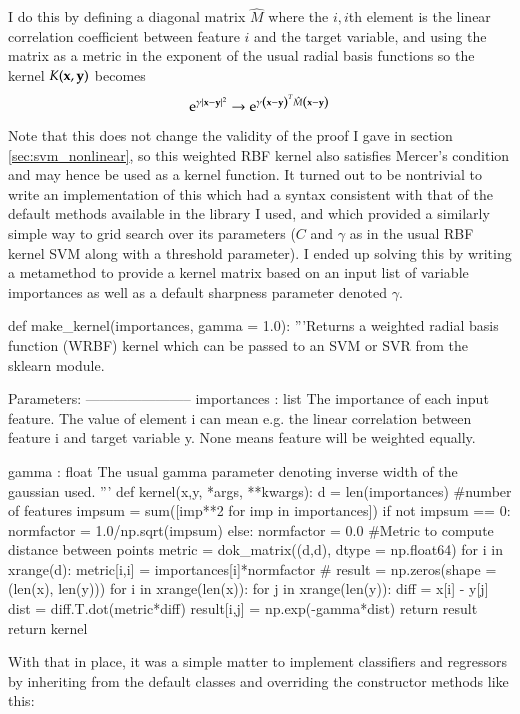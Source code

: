 I do this by defining a diagonal matrix $\hat{M}$ where the $i, i$th element is the linear correlation coefficient between feature $i$ and the target variable, and using the matrix as a metric in the exponent of the usual radial basis functions so the kernel $K(\mathbf{x}, \mathbf{y})$ becomes
\begin{equation}
	\mathrm{e}^{\gamma|\mathbf{x}-\mathbf{y}|^2} \rightarrow \mathrm{e}^{\gamma \left( \mathbf{x}-\mathbf{y} \right)^T \hat{M} \left( \mathbf{x}-\mathbf{y} \right)}
\end{equation}
Note that this does not change the validity of the proof I gave in section \ref{sec:svm_nonlinear}, so this weighted RBF kernel also satisfies Mercer's condition and may hence be used as a kernel function. It turned out to be nontrivial to write an implementation of this which had a syntax consistent with that of the default methods available in the library I used, and which provided a similarly simple way to grid search over its parameters ($C$ and $\gamma$ as in the usual RBF kernel SVM along with a threshold parameter). I ended up solving this by writing a metamethod to provide a kernel matrix based on an input list of variable importances as well as a default sharpness parameter denoted $\gamma$.
\begin{snippet}
	def make_kernel(importances, gamma = 1.0):
		'''Returns a weighted radial basis function (WRBF) kernel which can be 
		passed to an SVM or SVR from the sklearn module.
		
		Parameters:
		-----------------------
		importances : list
		  The importance of each input feature. The value of element i can mean
		  e.g. the linear correlation between feature i and target variable y.
		  None means feature will be weighted equally.
		
		gamma : float
		  The usual gamma parameter denoting inverse width of the gaussian used.
		'''
		def kernel(x,y, *args, **kwargs):
			d = len(importances)  #number of features
			impsum = sum([imp**2 for imp in importances])
			if not impsum == 0:
				normfactor = 1.0/np.sqrt(impsum)
			else:
				normfactor = 0.0
			#Metric to compute distance between points
			metric = dok_matrix((d,d), dtype = np.float64)
			for i in xrange(d):
				metric[i,i] = importances[i]*normfactor
			# 
			result = np.zeros(shape = (len(x), len(y)))
			for i in xrange(len(x)):
				for j in xrange(len(y)):
					diff = x[i] - y[j]
					dist = diff.T.dot(metric*diff)
					result[i,j] = np.exp(-gamma*dist)
			return result
		return kernel
\end{snippet}
With that in place, it was a simple matter to implement classifiers and regressors by inheriting from the default classes and overriding the constructor methods like this:
